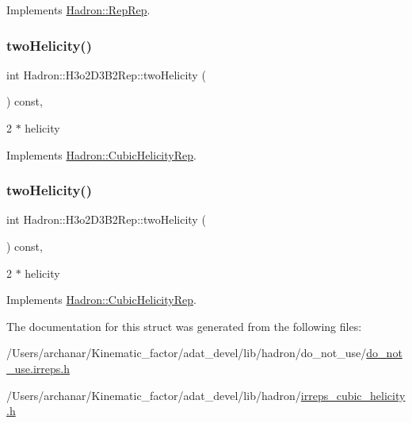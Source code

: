 Implements \mbox{\hyperlink{structHadron_1_1RepRep_ab3213025f6de249f7095892109575fde}{Hadron\+::\+Rep\+Rep}}.

\mbox{\label{structHadron_1_1H3o2D3B2Rep_ad5a4c1e91f9852b28e13bb4813fe6e84}} 
\subsubsection{\texorpdfstring{twoHelicity()}{twoHelicity()}\hspace{0.1cm}{\footnotesize\ttfamily [1/2]}}
{\footnotesize\ttfamily int Hadron\+::\+H3o2\+D3\+B2\+Rep\+::two\+Helicity (\begin{DoxyParamCaption}{ }\end{DoxyParamCaption}) const\hspace{0.3cm}{\ttfamily [inline]}, {\ttfamily [virtual]}}

2 $\ast$ helicity 

Implements \mbox{\hyperlink{structHadron_1_1CubicHelicityRep_af507aa56fc2747eacc8cb6c96db31ecc}{Hadron\+::\+Cubic\+Helicity\+Rep}}.

\mbox{\label{structHadron_1_1H3o2D3B2Rep_ad5a4c1e91f9852b28e13bb4813fe6e84}} 
\subsubsection{\texorpdfstring{twoHelicity()}{twoHelicity()}\hspace{0.1cm}{\footnotesize\ttfamily [2/2]}}
{\footnotesize\ttfamily int Hadron\+::\+H3o2\+D3\+B2\+Rep\+::two\+Helicity (\begin{DoxyParamCaption}{ }\end{DoxyParamCaption}) const\hspace{0.3cm}{\ttfamily [inline]}, {\ttfamily [virtual]}}

2 $\ast$ helicity 

Implements \mbox{\hyperlink{structHadron_1_1CubicHelicityRep_af507aa56fc2747eacc8cb6c96db31ecc}{Hadron\+::\+Cubic\+Helicity\+Rep}}.



The documentation for this struct was generated from the following files\+:\begin{DoxyCompactItemize}
\item 
/\+Users/archanar/\+Kinematic\+\_\+factor/adat\+\_\+devel/lib/hadron/do\+\_\+not\+\_\+use/\mbox{\hyperlink{do__not__use_8irreps_8h}{do\+\_\+not\+\_\+use.\+irreps.\+h}}\item 
/\+Users/archanar/\+Kinematic\+\_\+factor/adat\+\_\+devel/lib/hadron/\mbox{\hyperlink{lib_2hadron_2irreps__cubic__helicity_8h}{irreps\+\_\+cubic\+\_\+helicity.\+h}}\end{DoxyCompactItemize}
